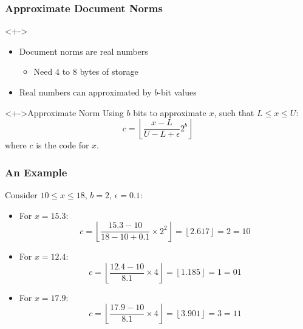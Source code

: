\documentclass[svgnames]{beamer}
\begin{document}
\begin{frame}
  \frametitle{Approximate Document Norms}
  
  \begin{block}<+->{}
    \begin{itemize}
    \item Document norms are real numbers
      \begin{itemize}
      \item Need 4 to 8 bytes of storage
      \end{itemize}
    \item Real numbers can approximated by $b$-bit values
    \end{itemize}
  \end{block}

  \begin{block}<+->{Approximate Norm}
    Using $b$ bits to approximate $x$, such that $L \leq x \leq U$:
    \begin{displaymath}
      c = \left\lfloor \frac{x - L}{U - L + \epsilon} 2^b \right\rfloor
    \end{displaymath}
    where $c$ is the code for $x$.
  \end{block}

\end{frame}


\begin{frame} \frametitle{An Example}
  
  \begin{exampleblock}{}
    Consider $10 \leq x \leq 18$, $b = 2$, $\epsilon = 0.1$:
    \begin{itemize}
    \item For $x = 15.3$:
      \begin{displaymath}
        c = \left\lfloor \frac{15.3 - 10}{18 - 10 + 0.1} \times 2^2 \right\rfloor = 
        \left\lfloor 2.617 \right\rfloor = 2 = 10
      \end{displaymath}
    \item For $x = 12.4$:
      \begin{displaymath}
        c = \left\lfloor \frac{12.4 - 10}{8.1} \times 4 \right\rfloor =
        \left\lfloor 1.185 \right\rfloor = 1 = 01
      \end{displaymath}
    \item For $x = 17.9$:
      \begin{displaymath}
        c = \left\lfloor \frac{17.9 - 10}{8.1} \times 4 \right\rfloor = 
        \left\lfloor 3.901 \right\rfloor = 3 = 11
      \end{displaymath}
    \end{itemize}
  \end{exampleblock}

\end{frame}
\end{document}
